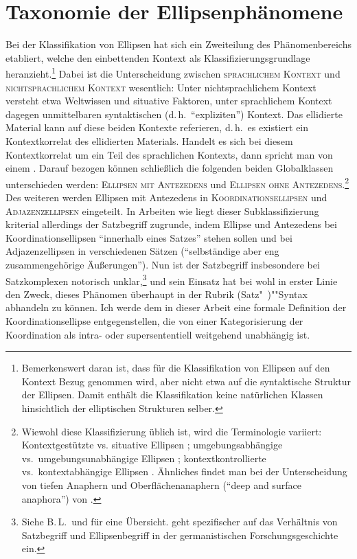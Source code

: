 \section{Taxonomie der Ellipsenphänomene} \label{sec-ellipse-taxonomie}

Bei der Klassifikation von Ellipsen hat sich ein Zweiteilung des Phänomenbereichs etabliert, welche den einbettenden Kontext als Klassifizierungsgrundlage heranzieht.\footnote{Bemerkenswert daran ist, dass für die Klassifikation von Ellipsen auf den Kontext Bezug genommen wird, aber nicht etwa auf die syntaktische Struktur der Ellipsen. Damit enthält die Klassifikation keine natürlichen Klassen hinsichtlich der elliptischen Strukturen selber.} Dabei ist die Unterscheidung zwischen \textsc{sprachlichem Kontext} und \textsc{nichtsprachlichem Kontext} wesentlich: Unter nichtsprachlichem Kontext versteht etwa \citet[766]{Klein:93} Weltwissen und situative Faktoren, unter sprachlichem Kontext dagegen unmittelbaren syntaktischen (d.\,h.\ "`expliziten"') Kontext. Das ellidierte Material kann auf diese beiden Kontexte referieren, d.\,h.\ es existiert ein Kontextkorrelat des ellidierten Materials. Handelt es sich bei diesem Kontextkorrelat um ein Teil des sprachlichen Kontexts, dann spricht man von einem . Darauf bezogen können schlie\ss lich die folgenden beiden Globalklassen unterschieden werden: \textsc{Ellipsen mit Antezedens} und \textsc{Ellipsen ohne Antezedens}.\footnote{Wiewohl diese Klassifizierung üblich ist, wird die Terminologie variiert: Kontextgestützte vs. situative Ellipsen \citep{Schwabe:94}; umgebungsabhängige vs.\ umgebungsunabhängige Ellipsen \citep{Kindt:85}; kontextkontrollierte vs.\ kontextabhängige Ellipsen \citep{Klein:93}. Ähnliches findet man bei der Unterscheidung von tiefen Anaphern und Oberflächenanaphern ("`deep and surface anaphora"') von \cite{Hankamer:Sag:76}.} Des weiteren werden Ellipsen mit Antezedens in \textsc{Koordinationsellipsen} und \textsc{Adjazenzellipsen} eingeteilt. In Arbeiten wie \citet[768]{Klein:93} liegt dieser Subklassifizierung kriterial allerdings der Satzbegriff zugrunde, indem Ellipse und Antezedens bei Koordinationsellipsen "`innerhalb eines Satzes"' stehen sollen und bei Adjazenzellipsen in verschiedenen Sätzen ("`selbständige aber eng zusammengehörige Äu\ss erungen"'). Nun ist der Satzbegriff insbesondere bei Satzkomplexen notorisch unklar,\footnote{Siehe B.\,L.\,\cite{Mueller:85} und \citet[91ff]{Matthews:93} für eine Übersicht. \citet[86ff]{Ortner:87} geht spezifischer auf das Verhältnis von Satzbegriff und Ellipsenbegriff in der germanistischen Forschungsgeschichte ein.} und sein Einsatz hat bei \cite{Klein:93} wohl in erster Linie den Zweck, dieses Phänomen überhaupt in der Rubrik (Satz"~)""Syntax abhandeln zu können. Ich werde dem in dieser Arbeit eine formale Definition der Koordinationsellipse entgegenstellen, die von einer Kategorisierung der Koordination als intra- oder supersententiell weitgehend unabhängig ist. 


